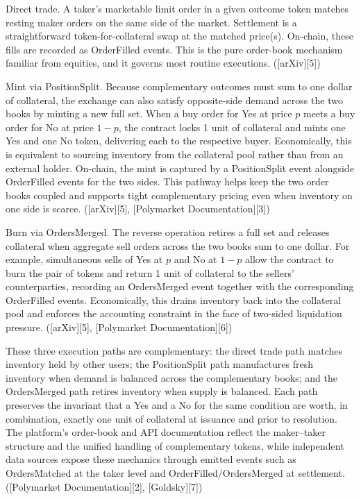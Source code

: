 Direct trade. A taker’s marketable limit order in a given outcome token matches resting maker orders on the same side of the market. Settlement is a straightforward token-for-collateral swap at the matched price(s). On-chain, these fills are recorded as OrderFilled events. This is the pure order-book mechanism familiar from equities, and it governs most routine executions. ([arXiv][5])

Mint via PositionSplit. Because complementary outcomes must sum to one dollar of collateral, the exchange can also satisfy opposite-side demand across the two books by minting a new full set. When a buy order for Yes at price $p$ meets a buy order for No at price $1-p$, the contract locks 1 unit of collateral and mints one Yes and one No token, delivering each to the respective buyer. Economically, this is equivalent to sourcing inventory from the collateral pool rather than from an external holder. On-chain, the mint is captured by a PositionSplit event alongside OrderFilled events for the two sides. This pathway helps keep the two order books coupled and supports tight complementary pricing even when inventory on one side is scarce. ([arXiv][5], [Polymarket Documentation][3])

Burn via OrdersMerged. The reverse operation retires a full set and releases collateral when aggregate sell orders across the two books sum to one dollar. For example, simultaneous sells of Yes at $p$ and No at $1-p$ allow the contract to burn the pair of tokens and return 1 unit of collateral to the sellers’ counterparties, recording an OrdersMerged event together with the corresponding OrderFilled events. Economically, this drains inventory back into the collateral pool and enforces the accounting constraint in the face of two-sided liquidation pressure. ([arXiv][5], [Polymarket Documentation][6])

These three execution paths are complementary: the direct trade path matches inventory held by other users; the PositionSplit path manufactures fresh inventory when demand is balanced across the complementary books; and the OrdersMerged path retires inventory when supply is balanced. Each path preserves the invariant that a Yes and a No for the same condition are worth, in combination, exactly one unit of collateral at issuance and prior to resolution. The platform’s order-book and API documentation reflect the maker–taker structure and the unified handling of complementary tokens, while independent data sources expose these mechanics through emitted events such as OrdersMatched at the taker level and OrderFilled/OrdersMerged at settlement. ([Polymarket Documentation][2], [Goldsky][7])

